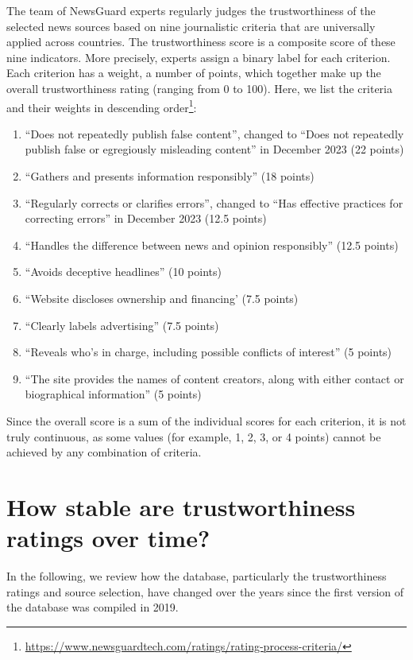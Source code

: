 \documentclass[12pt,twoside]{article}
\begin{document}
The team of NewsGuard experts regularly judges the trustworthiness of the selected news sources based on nine journalistic criteria that are universally applied across countries.
The trustworthiness score is a composite score of these nine indicators. 
More precisely, experts assign a binary label for each criterion. 
Each criterion has a weight, a number of points, which together make up the overall trustworthiness rating (ranging from 0 to 100). 
Here, we list the criteria and their weights in descending order\footnote{\href{https://web.archive.org/web/20240131155450/https://www.newsguardtech.com/ratings/rating-process-criteria/}{https://www.newsguardtech.com/ratings/rating-process-criteria/}}:

\begin{enumerate}
  \item ``Does not repeatedly publish false content'', changed to ``Does not repeatedly publish false or egregiously misleading content'' in December 2023 (22 points)
  \item ``Gathers and presents information responsibly'' (18 points) 
  \item ``Regularly corrects or clarifies errors'', changed to ``Has effective practices for correcting errors'' in December 2023 (12.5 points)
  \item ``Handles the difference between news and opinion responsibly'' (12.5 points)
  \item ``Avoids deceptive headlines'' (10 points)
  \item ``Website discloses ownership and financing' (7.5 points)
  \item ``Clearly labels advertising'' (7.5 points)
  \item ``Reveals who's in charge, including possible conflicts of interest'' (5 points)
  \item ``The site provides the names of content creators, along with either contact or biographical information'' (5 points)
\end{enumerate}

Since the overall score is a sum of the individual scores for each criterion, it is not truly continuous, as some values (for example, 1, 2, 3, or 4 points) cannot be achieved by any combination of criteria.

\section{How stable are trustworthiness ratings over time?}
In the following, we review how the database, particularly the trustworthiness ratings and source selection, have changed over the years since the first version of the database was compiled in 2019.
\end{document}
